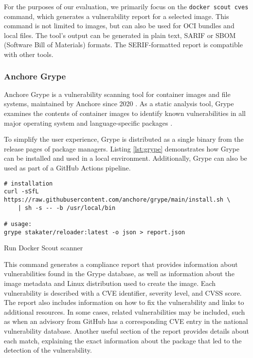\FloatBarrier

For the purposes of our evaluation, we primarily focus on the \texttt{docker scout cves} command, which generates a vulnerability report for a selected image. This command is not limited to images, but can also be used for OCI bundles and local files. The tool's output can be generated in plain text, SARIF or SBOM (Software Bill of Materials) formats. The SERIF-formatted report is compatible with other tools.


\subsubsection{Anchore Grype}

Anchore Grype is a vulnerability scanning tool for container images and file systems, maintained by Anchore since 2020 \cite{s:anchore}. As a static analysis tool, Grype examines the contents of container images to identify known vulnerabilities in all major operating system and language-specific packages \cite{gh:grype}.

To simplify the user experience, Grype is distributed as a single binary from the release pages of package managers. Listing \ref{lst:grype} demonstrates how Grype can be installed and used in a local environment. Additionally, Grype can also be used as part of a GitHub Actions pipeline.


\begin{listing}[htp]
    \centering
    \begin{minipage}{1\linewidth}
        \begin{verbatim}
# installation
curl -sSfL https://raw.githubusercontent.com/anchore/grype/main/install.sh \
    | sh -s -- -b /usr/local/bin

# usage:
grype stakater/reloader:latest -o json > report.json
        \end{verbatim}
    \end{minipage}
    \caption{Run Docker Scout scanner}
    \label{lst:grype}
\end{listing}

This command generates a compliance report that provides information about vulnerabilities found in the Grype database, as well as information about the image metadata and Linux distribution used to create the image. Each vulnerability is described with a CVE identifier, severity level, and CVSS score. The report also includes information on how to fix the vulnerability and links to additional resources. In some cases, related vulnerabilities may be included, such as when an advisory from GitHub has a corresponding CVE entry in the national vulnerability database. Another useful section of the report provides details about each match, explaining the exact information about the package that led to the detection of the vulnerability.

